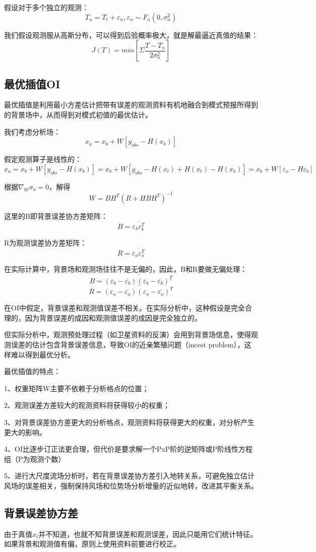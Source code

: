 \documentclass{article}
\begin{document}
假设对于多个独立的观测：
$$T_n = T_t + \varepsilon_n, \varepsilon_n\sim F_n(0, \sigma^2_n)$$

我们假设观测服从高斯分布，可以得到后验概率极大，就是解最逼近真值的结果：
$$J(T) = min[\Sigma \frac{T-T_n}{2\sigma_n^2}]$$

\subsection{最优插值OI}
最优插值是利用最小方差估计把带有误差的观测资料有机地融合到模式预报所得到的背景场中，从而得到对模式初值的最优估计。

我们考虑分析场：
$$x_a = x_b + W[y_{obs} - H(x_b)]$$

假定观测算子是线性的：
$$x_a = x_b + W[y_{obs} - H(x_b)] =  x_b + W[y_{obs}-H(x_t)+H(x_t)-H(x_b)]=x_b + W[\varepsilon_o-H\varepsilon_b]$$

根据$\nabla_W \sigma_a = 0$，解得
$$W = BH^T(R + HBH^T)^{-1}$$

这里的B即背景误差协方差矩阵：
$$B=\overline{\varepsilon_b\varepsilon_b^T}$$

R为观测误差协方差矩阵：
$$R=\overline{\varepsilon_o\varepsilon_o^T}$$

在实际计算中，背景场和观测场往往不是无偏的，因此，B和R要做无偏处理：
$$B=\overline{(\varepsilon_b-\overline{\varepsilon_b})(\varepsilon_b-\overline{\varepsilon_b})^T}$$
$$R=\overline{(\varepsilon_o-\overline{\varepsilon_o})(\varepsilon_o-\overline{\varepsilon_o})^T}$$

在OI中假定，背景误差和观测值误差不相关。在实际分析中，这种假设是完全合理的，因为背景误差的成因和观测值误差的成因是完全独立的。

但实际分析中，观测预处理过程（如卫星资料的反演）会用到背景场信息，使得观测误差的估计包含背景误差信息，导致OI的近亲繁殖问题（incest problem），这样难以得到最优分析。

最优插值的特点：

1、权重矩阵W主要不依赖于分析格点的位置；

2、观测误差方差较大的观测资料将获得较小的权重；

3、对背景误差协方差更大的分析格点，观测资料将获得更大的权重，对分析产生更大的影响。  

4、OI比逐步订正法更合理，但代价是要求解一个PxP阶的逆矩阵或P阶线性方程组（P为观测个数）

5、进行大尺度流场分析时，若在背景误差协方差引入地转关系，可避免独立估计风场的误差相关，强制保持风场和位势场分析增量的近似地转，改进其平衡关系。


\subsection{背景误差协方差}
由于真值$x_t$并不知道，也就不知背景误差和观测误差，因此只能用它们统计特征。如果背景和观测值有偏，原则上使用资料前要进行校正。
\end{document}

